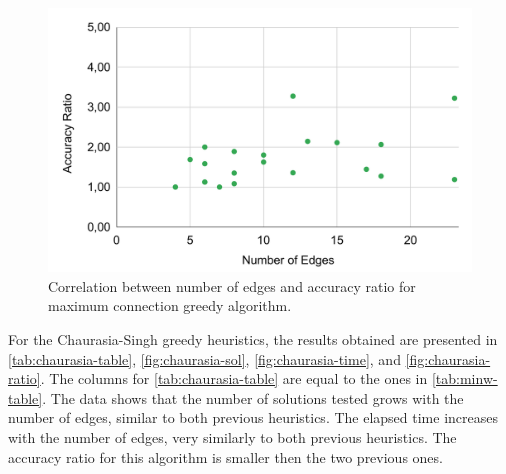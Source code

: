 \begin{figure}[!ht]
    \centering
    \includegraphics[width=0.9\linewidth]{figs/maxc-ratio.pdf}
    \caption{Correlation between number of edges and accuracy ratio for maximum connection greedy algorithm.}
    \label{fig:maxc-ratio}
\end{figure}

For the Chaurasia-Singh greedy heuristics, the results obtained are presented in \autoref{tab:chaurasia-table}, \autoref{fig:chaurasia-sol}, \autoref{fig:chaurasia-time}, and \autoref{fig:chaurasia-ratio}. 
The columns for \autoref{tab:chaurasia-table} are equal to the ones in \autoref{tab:minw-table}.
The data shows that the number of solutions tested grows with the number of edges, similar to both previous heuristics.
The elapsed time increases with the number of edges, very similarly to both previous heuristics.
The accuracy ratio for this algorithm is smaller then the two previous ones.



